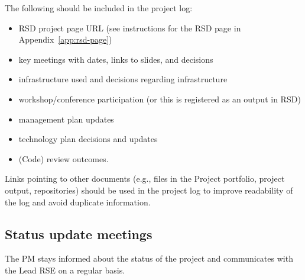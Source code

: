 The following should be included in the project log:
\begin{itemize}[itemsep=-4pt,parsep=4pt]
\item RSD project page URL (see instructions for the RSD page in Appendix~\ref{app:rsd-page})
\item key meetings with dates, links to slides, and decisions
\item infrastructure used and decisions regarding infrastructure
\item workshop/conference participation (or this is registered as an output in RSD)
\item management plan updates
\item technology plan decisions and updates
\item (Code) review outcomes.
\end{itemize}

Links pointing to other documents (e.g., files in the Project portfolio, project output, repositories) should be used in
the project log to improve readability of the log and avoid duplicate information.

\subsection{Status update meetings}
\label{sec:exec:status}
The PM stays informed about the status of the project and communicates with the Lead RSE on a regular basis.


